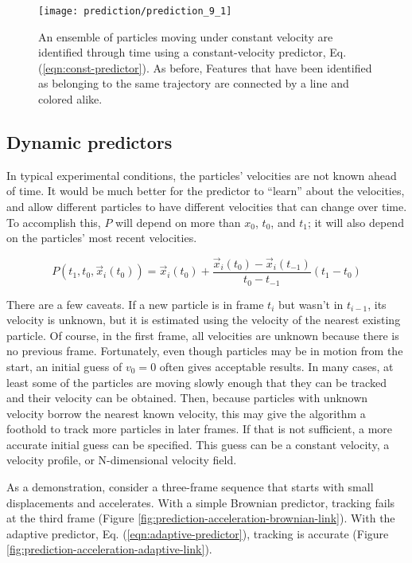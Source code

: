    \begin{figure}
    \centering
    \texttt{[image: prediction/prediction\_9\_1]}
    \caption{\label{fig:prediction-const-const-link}An ensemble of particles moving under constant velocity are identified through time using a constant-velocity predictor, Eq. (\ref{eqn:const-predictor}). As before, Features that have been identified as belonging to the same trajectory are connected by a line and colored alike. }
    \end{figure}

\subsection{Dynamic predictors}\label{dynamic-predictors}

In typical experimental conditions, the particles' velocities are not known ahead of time. It would be much better for the predictor to ``learn'' about
the velocities, and allow different particles to have different
velocities that can change over time. To accomplish this, $P$ will depend on more than $x_0$, $t_0$, and $t_1$; it will also depend on the particles' most recent velocities.

\begin{equation}
\label{eqn:adaptive-predictor}
P(t_1, t_0, \vec x_i(t_0)) = \vec x_i(t_0) + \frac{\vec x_i(t_0) - \vec x_i(t_{-1})}{t_0 - t_{-1}} (t_1 - t_0)
\end{equation}

There are a few caveats.
  If a new particle is in frame $t_i$ but wasn't in $t_{i-1}$, its velocity is unknown, but it is estimated using the velocity of the nearest existing particle. Of course, in the first frame, all
  velocities are unknown because
  there is no previous frame. Fortunately, even though particles may be in motion from the start, an initial guess
  of $v_0 = 0$ often gives acceptable results. In many cases, at
  least some of the particles are moving slowly enough that they can be
  tracked and their velocity can be obtained. Then, because particles with
  unknown velocity borrow the nearest known velocity, this may give the algorithm a foothold to track more particles
  in later frames. If that is not sufficient, a more accurate initial guess can be specified. This guess can be a constant velocity, a velocity profile, or N-dimensional velocity field.

As a demonstration, consider a three-frame sequence that starts
with small displacements and accelerates. With a simple Brownian predictor, tracking fails at the third frame (Figure \ref{fig:prediction-acceleration-brownian-link}). With the adaptive predictor, Eq. (\ref{eqn:adaptive-predictor}), tracking is accurate (Figure \ref{fig:prediction-acceleration-adaptive-link}).


